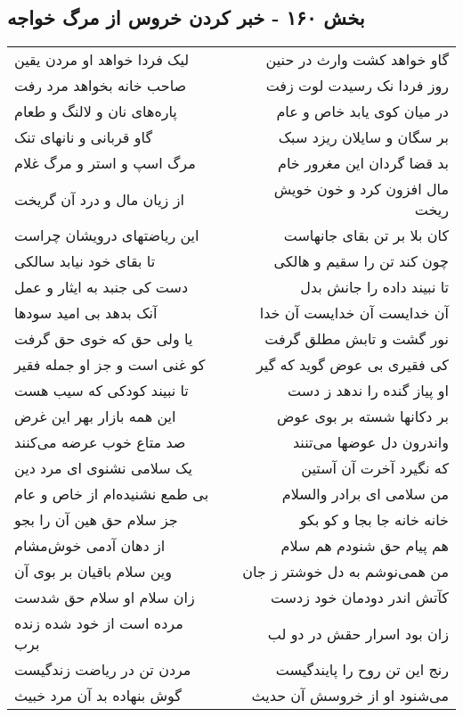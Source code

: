 \begin{center}
\section*{بخش ۱۶۰ - خبر کردن خروس از مرگ خواجه}
\label{sec:sh160}
\begin{longtable}{l p{0.5cm} r}
لیک فردا خواهد او مردن یقین
&&
گاو خواهد کشت وارث در حنین
\\
صاحب خانه بخواهد مرد رفت
&&
روز فردا نک رسیدت لوت زفت
\\
پاره‌های نان و لالنگ و طعام
&&
در میان کوی یابد خاص و عام
\\
گاو قربانی و نانهای تنک
&&
بر سگان و سایلان ریزد سبک
\\
مرگ اسپ و استر و مرگ غلام
&&
بد قضا گردان این مغرور خام
\\
از زیان مال و درد آن گریخت
&&
مال افزون کرد و خون خویش ریخت
\\
این ریاضتهای درویشان چراست
&&
کان بلا بر تن بقای جانهاست
\\
تا بقای خود نیابد سالکی
&&
چون کند تن را سقیم و هالکی
\\
دست کی جنبد به ایثار و عمل
&&
تا نبیند داده را جانش بدل
\\
آنک بدهد بی امید سودها
&&
آن خدایست آن خدایست آن خدا
\\
یا ولی حق که خوی حق گرفت
&&
نور گشت و تابش مطلق گرفت
\\
کو غنی است و جز او جمله فقیر
&&
کی فقیری بی عوض گوید که گیر
\\
تا نبیند کودکی که سیب هست
&&
او پیاز گنده را ندهد ز دست
\\
این همه بازار بهر این غرض
&&
بر دکانها شسته بر بوی عوض
\\
صد متاع خوب عرضه می‌کنند
&&
واندرون دل عوضها می‌تنند
\\
یک سلامی نشنوی ای مرد دین
&&
که نگیرد آخرت آن آستین
\\
بی طمع نشنیده‌ام از خاص و عام
&&
من سلامی ای برادر والسلام
\\
جز سلام حق هین آن را بجو
&&
خانه خانه جا بجا و کو بکو
\\
از دهان آدمی خوش‌مشام
&&
هم پیام حق شنودم هم سلام
\\
وین سلام باقیان بر بوی آن
&&
من همی‌نوشم به دل خوشتر ز جان
\\
زان سلام او سلام حق شدست
&&
کآتش اندر دودمان خود زدست
\\
مرده است از خود شده زنده برب
&&
زان بود اسرار حقش در دو لب
\\
مردن تن در ریاضت زندگیست
&&
رنج این تن روح را پایندگیست
\\
گوش بنهاده بد آن مرد خبیث
&&
می‌شنود او از خروسش آن حدیث
\\
\end{longtable}
\end{center}
